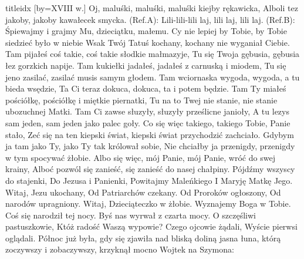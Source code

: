 \documentclass[a5paper, portrait, 12pt]{mwart}
\begin{document}
\begin{songs}{titleidx}
[by={XVIII w.}]
\beginverse
    Oj, maluśki, maluśki, maluśki kiejby rękawicka,
    Alboli tez jakoby, jakoby kawałecek smycka.
\endverse
\beginchorus
        (Ref.A): Lili-lili-lili laj, lili laj, lili laj.
        (Ref.B): Śpiewajmy i grajmy Mu, dzieciątku, małemu.
\endchorus
\beginverse
    Cy nie lepiej by Tobie, by Tobie siedzieć było w niebie
    Wsak Twój Tatuś kochany, kochany nie wyganiał Ciebie.
\endverse
\beginverse
    Tam pijałeś coś takie, coś takie słodkie małmazyje,
    Tu się Twoja gębusia, gębusia łez gorzkich napije.
\endverse
\beginverse
    Tam kukiełki jadałeś, jadałeś z carnuską i miodem,
    Tu się jeno zasilać, zasilać musis samym głodem.
\endverse
\beginverse
    Tam wciornaska wygoda, wygoda, a tu bieda wsędzie,
    Ta Ci teraz dokuca, dokuca, ta i potem będzie.
\endverse
\beginverse
    Tam Ty miałeś pościółkę, pościółkę i miętkie piernatki,
    Tu na to Twej nie stanie, nie stanie ubozuchnej Matki.
\endverse
\beginverse
    Tam Ci zawse słuzyły, słuzyły prześlicne janioły,
    A tu lezys sam jeden, sam jeden jako palec goły.
\endverse
\beginverse
    Co się więc takiego, takiego Tobie, Panie stało,
    Zeć się na ten kiepski świat, kiepski świat przychodzić zachciało.
\endverse
\beginverse
    Gdybym ja tam jako Ty, jako Ty tak królował sobie,
    Nie chciałby ja przenigdy, przenigdy w tym spocywać żłobie.
\endverse
\beginverse
    Albo się więc, mój Panie, mój Panie, wróć do swej krainy,
    Alboć pozwól się zanieść, się zanieść do nasej chałpiny.
\endverse
\endsong
\beginverse
    Pójdźmy wszyscy do stajenki,
    Do Jezusa i Panienki,
\endverse
\beginchorus
    Powitajmy Maleńkiego
    I Maryję Matkę Jego.
\endchorus
\beginverse
    Witaj, Jezu ukochany,
    Od Patriarchów czekany.
\endverse
\beginchorus
    Od Proroków ogłoszony,
    Od narodów upragniony.
\endchorus
\beginverse
    Witaj, Dzieciąteczko w żłobie.
    Wyznajemy Boga w Tobie.
\endverse
\beginchorus
    Coś się narodził tej nocy.
    Byś nas wyrwał z czarta mocy.
\endchorus
\beginverse
    O szczęśliwi pastuszkowie,
    Któż radość Waszą wypowie?
\endverse
\beginchorus
    Czego ojcowie żądali,
    Wyście pierwsi oglądali.
\endchorus
\endsong
\beginverse
Północ już była, gdy się zjawiła
nad bliską doliną jasna łuna,
którą zoczywszy i zobaczywszy,
krzyknął mocno Wojtek na Szymona:
\endverse
\beginchorus

\end{songs}
\end{document}
